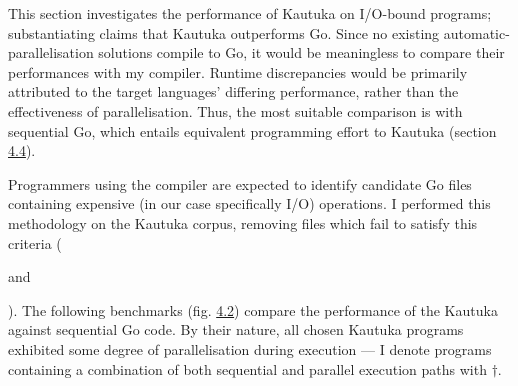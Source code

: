 This section investigates the performance of Kautuka on I/O-bound programs; substantiating claims that Kautuka outperforms Go. Since no existing automatic-parallelisation solutions compile to Go, it would be meaningless to compare their performances with my compiler. Runtime discrepancies would be primarily attributed to the target languages' differing performance, rather than the effectiveness of parallelisation. Thus, the most suitable comparison is with sequential Go, which entails equivalent programming effort to Kautuka (section \hyperref[sec:4.4]{4.4}).

Programmers using the compiler are expected to identify candidate Go files containing expensive (in our case specifically I/O) operations. I performed this methodology on the Kautuka corpus, removing files which fail to satisfy this criteria ( and ). The following benchmarks (fig. \hyperref[fig:4.2]{4.2}) compare the performance of the Kautuka against sequential Go code. By their nature, all chosen Kautuka programs exhibited some degree of parallelisation during execution --- I denote programs containing a combination of both sequential and parallel execution paths with \( \dag \).


\mydata


